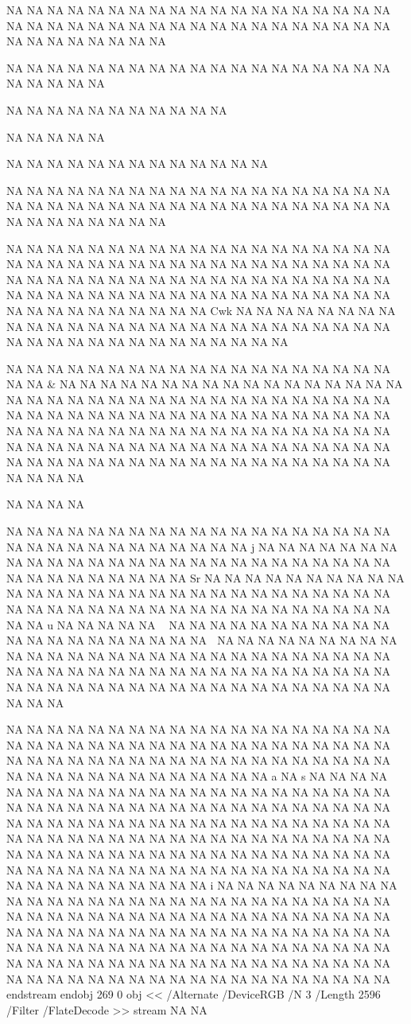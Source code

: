 NA
NA
NA
NA
NA
NA
NA
NA
NA
NA
NA
NA
NA
NA
NA
NA
NA
NA
NA
NA
NA
NA
NA
NA
NA
NA
NA
NA
NA
NA
NA
NA
NA
NA
NA
NA
NA
NA
NA
NA
NA
NA
NA
NA
NA
NA
{
NA
NA
NA
NA
NA
NA
NA
NA
NA
NA
NA
NA
NA
NA
NA
NA
NA
NA
NA
NA
NA
NA
NA
NA

NA
NA
NA
NA
NA
NA
NA
NA
NA
NA
NA

NA
NA
NA
NA
NA

NA
NA
NA
NA
NA
NA
NA
NA
NA
NA
NA
NA
NA

NA
NA
NA
NA
NA
NA
NA
NA
NA
NA
NA
NA
NA
NA
NA
NA
NA
NA
NA
NA
NA
NA
NA
NA
NA
NA
NA
NA
NA
NA
NA
NA
NA
NA
NA
NA
NA
NA
NA
NA
NA
NA
NA
NA
NA
NA

NA
NA
NA
NA
NA
NA
NA
NA
NA
NA
NA
NA
NA
NA
NA
NA
NA
NA
NA
NA
NA
NA
NA
NA
NA
NA
NA
NA
NA
NA
NA
NA
NA
NA
NA
NA
NA
NA
NA
NA
NA
NA
NA
NA
NA
NA
NA
NA
NA
NA
NA
NA
NA
NA
NA
NA
NA
NA
NA
NA
NA
NA
NA
NA
NA
NA
NA
NA
NA
NA
NA
NA
NA
NA
NA
NA
NA
NA
NA
NA
NA
NA
NA
NA
NA
NA
Cwk
NA
NA
NA
NA
NA
NA
NA
NA
NA
NA
NA
NA
NA
NA
NA
NA
NA
NA
NA
NA
NA
NA
NA
NA
NA
NA
NA
NA
NA
NA
NA
NA
NA
NA
NA
NA
NA
NA
NA
NA
NA

NA
NA
NA
NA
NA
NA
NA
NA
NA
NA
NA
NA
NA
NA
NA
NA
NA
NA
NA
NA
NA
&
NA
NA
NA
NA
NA
NA
NA
NA
NA
NA
NA
NA
NA
NA
NA
NA
NA
NA
NA
NA
NA
NA
NA
NA
NA
NA
NA
NA
NA
NA
NA
NA
NA
NA
NA
NA
NA
NA
NA
NA
NA
NA
NA
NA
NA
NA
NA
NA
NA
NA
NA
NA
NA
NA
NA
NA
NA
NA
NA
NA
NA
NA
NA
NA
NA
NA
NA
NA
NA
NA
NA
NA
NA
NA
NA
NA
NA
NA
NA
NA
NA
NA
NA
NA
NA
NA
NA
NA
NA
NA
NA
NA
NA
NA
NA
NA
NA
NA
NA
NA
NA
NA
NA
NA
NA
NA
NA
NA
NA
NA
NA
NA
NA
NA
NA
NA

NA
NA
NA
NA

NA
NA
NA
NA
NA
NA
NA
NA
NA
NA
NA
NA
NA
NA
NA
NA
NA
NA
NA
NA
NA
NA
NA
NA
NA
NA
NA
NA
NA
NA
NA
j
NA
NA
NA
NA
NA
NA
NA
NA
NA
NA
NA
NA
NA
NA
NA
NA
NA
NA
NA
NA
NA
NA
NA
NA
NA
NA
NA
NA
NA
NA
NA
NA
NA
NA
NA
Sr
NA
NA
NA
NA
NA
NA
NA
NA
NA
NA
NA
NA
NA
NA
NA
NA
NA
NA
NA
NA
NA
NA
NA
NA
NA
NA
NA
NA
NA
NA
NA
NA
NA
NA
NA
NA
NA
NA
NA
NA
NA
NA
NA
NA
NA
NA
NA
NA
NA
NA
u
NA
NA
NA
NA
NA

NA
NA
NA
NA
NA
NA
NA
NA
NA
NA
NA
NA
NA
NA
NA
NA
NA
NA
NA
NA
NA

NA
NA
NA
NA
NA
NA
NA
NA
NA
NA
NA
NA
NA
NA
NA
NA
NA
NA
NA
NA
NA
NA
NA
NA
NA
NA
NA
NA
NA
NA
NA
NA
NA
NA
NA
NA
NA
NA
NA
NA
NA
NA
NA
NA
NA
NA
NA
NA
NA
NA
NA
NA
NA
NA
NA
NA
NA
NA
NA
NA
NA
NA
NA
NA
NA
NA
NA
NA
NA

NA
NA
NA
NA
NA
NA
NA
NA
NA
NA
NA
NA
NA
NA
NA
NA
NA
NA
NA
NA
NA
NA
NA
NA
NA
NA
NA
NA
NA
NA
NA
NA
NA
NA
NA
NA
NA
NA
NA
NA
NA
NA
NA
NA
NA
NA
NA
NA
NA
NA
NA
NA
NA
NA
NA
NA
NA
NA
NA
NA
NA
NA
NA
NA
NA
NA
NA
NA
NA
NA
a
NA
s
NA
NA
NA
NA
NA
NA
NA
NA
NA
NA
NA
NA
NA
NA
NA
NA
NA
NA
NA
NA
NA
NA
NA
NA
NA
NA
NA
NA
NA
NA
NA
NA
NA
NA
NA
NA
NA
NA
NA
NA
NA
NA
NA
NA
NA
NA
NA
NA
NA
NA
NA
NA
NA
NA
NA
NA
NA
NA
NA
NA
NA
NA
NA
NA
NA
NA
NA
NA
NA
NA
NA
NA
NA
NA
NA
NA
NA
NA
NA
NA
NA
NA
NA
NA
NA
NA
NA
NA
NA
NA
NA
NA
NA
NA
NA
NA
NA
NA
NA
NA
NA
NA
NA
NA
NA
NA
NA
NA
NA
NA
NA
NA
NA
NA
NA
NA
NA
NA
NA
NA
NA
NA
NA
NA
NA
NA
NA
NA
i
NA
NA
NA
NA
NA
NA
NA
NA
NA
NA
NA
NA
NA
NA
NA
NA
NA
NA
NA
NA
NA
NA
NA
NA
NA
NA
NA
NA
NA
NA
NA
NA
NA
NA
NA
NA
NA
NA
NA
NA
NA
NA
NA
NA
NA
NA
NA
NA
NA
NA
NA
NA
NA
NA
NA
NA
NA
NA
NA
NA
NA
NA
NA
NA
NA
NA
NA
NA
NA
NA
NA
NA
NA
NA
NA
NA
NA
NA
NA
NA
NA
NA
NA
NA
NA
NA
NA
NA
NA
NA
NA
NA
NA
NA
NA
NA
NA
NA
NA
NA
NA
NA
NA
NA
NA
NA
NA
NA
NA
NA
NA
NA
NA
NA
NA
NA
NA
NA
NA
NA
NA
NA
NA
endstream
endobj
269 0 obj
<<
/Alternate /DeviceRGB
/N 3
/Length 2596
/Filter /FlateDecode
>>
stream
NA
NA

}
